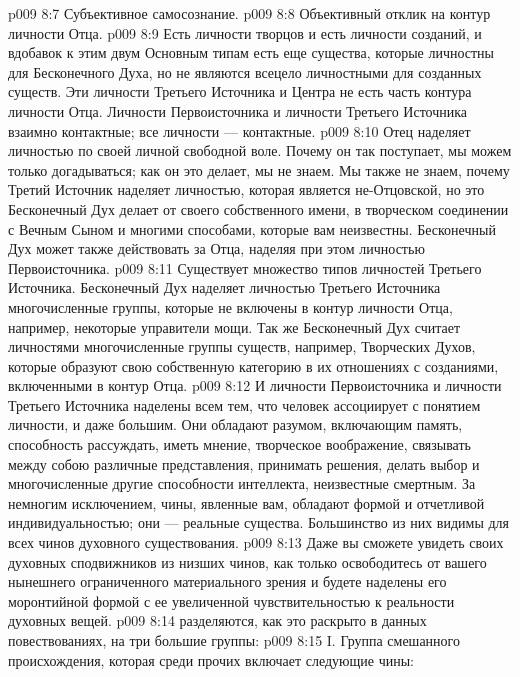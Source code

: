 \vs p009 8:7 \bibnobreakspace Субъективное самосознание.
\vs p009 8:8 \bibnobreakspace Объективный отклик на контур личности Отца.
\vs p009 8:9 \pc Есть личности творцов и есть личности созданий, и вдобавок к этим двум Основным типам есть еще  существа, которые личностны для Бесконечного Духа, но не являются всецело личностными для созданных существ. Эти личности Третьего Источника и Центра не есть часть контура личности Отца. Личности Первоисточника и личности Третьего Источника взаимно контактные; все личности --- контактные.
\vs p009 8:10 \pc Отец наделяет личностью по своей личной свободной воле. Почему он так поступает, мы можем только догадываться; как он это делает, мы не знаем. Мы также не знаем, почему Третий Источник наделяет личностью, которая является не\hyp{}Отцовской, но это Бесконечный Дух делает от своего собственного имени, в творческом соединении с Вечным Сыном и многими способами, которые вам неизвестны. Бесконечный Дух может также действовать за Отца, наделяя при этом личностью Первоисточника.
\vs p009 8:11 \pc Существует множество типов личностей Третьего Источника. Бесконечный Дух наделяет личностью Третьего Источника многочисленные группы, которые не включены в контур личности Отца, например, некоторые управители мощи. Так же Бесконечный Дух считает личностями многочисленные группы существ, например, Творческих Духов, которые образуют свою собственную категорию в их отношениях с созданиями, включенными в контур Отца.
\vs p009 8:12 И личности Первоисточника и личности Третьего Источника наделены всем тем, что человек ассоциирует с понятием личности, и даже большим. Они обладают разумом, включающим память, способность рассуждать, иметь мнение, творческое воображение, связывать между собою различные представления, принимать решения, делать выбор и многочисленные другие способности интеллекта, неизвестные смертным. За немногим исключением, чины, явленные вам, обладают формой и отчетливой индивидуальностью; они --- реальные существа. Большинство из них видимы для всех чинов духовного существования.
\vs p009 8:13 Даже вы сможете увидеть своих духовных сподвижников из низших чинов, как только освободитесь от вашего нынешнего ограниченного материального зрения и будете наделены его моронтийной формой с ее увеличенной чувствительностью к реальности духовных вещей.
\vs p009 8:14 \pc {} разделяются, как это раскрыто в данных повествованиях, на три большие группы:
\vs p009 8:15 \pc I.  Группа смешанного происхождения, которая среди прочих включает следующие чины:
